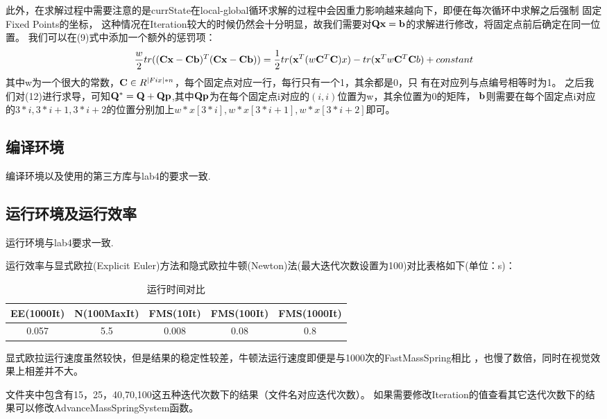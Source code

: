 \documentclass[]{ctexart}
\begin{document}
此外，在求解过程中需要注意的是currState在local-global循环求解的过程中会因重力影响越来越向下，即便在每次循环中求解之后强制
固定Fixed Points的坐标，
这种情况在Iteration较大的时候仍然会十分明显，故我们需要对$\bold{Q}\bold{x}=\bold{b}$的求解进行修改，将固定点前后确定在同一位置。
我们可以在(9)式中添加一个额外的惩罚项：
\begin{equation}
	\frac{w}{2}tr((\bold{C}\bold{x}-\bold{C}\bold{b})^T(\bold{C}\bold{x}-\bold{C}\bold{b}))=
	\frac{1}{2}tr(\bold{x}^T(w\bold{C}^T\bold{C})x)-tr(\bold{x}^Tw\bold{C}^T\bold{C}b)+constant
\end{equation}
其中w为一个很大的常数，$\bold{C}\in R^{\left\lvert Fix\right\rvert *n}$，每个固定点对应一行，每行只有一个1，其余都是0，只
有在对应列与点编号相等时为1。
之后我们对(12)进行求导，可知$\bold{Q^*}=\bold{Q}+\bold{Qp}$,其中$\bold{Qp}$为在每个固定点i对应的$(i,i)$位置为w，其余位置为0的矩阵，
$\bold{b}$则需要在每个固定点i对应的$3*i,3*i+1,3*i+2$的位置分别加上$w*x[3*i],w*x[3*i+1],w*x[3*i+2]$即可。
\subsection{编译环境}

编译环境以及使用的第三方库与lab4的要求一致.

\subsection{运行环境及运行效率}

运行环境与lab4要求一致.

运行效率与显式欧拉(Explicit Euler)方法和隐式欧拉牛顿(Newton)法(最大迭代次数设置为100)对比表格如下(单位：s)：
\begin{table}[h!]
	\begin{center}
	  \caption{运行时间对比}
	  \begin{tabular}{c|c|c|c|c} 
		\textbf{EE(1000It)} & \textbf{N(100MaxIt)} & \textbf{FMS(10It)}&\textbf{FMS(100It)}&\textbf{FMS(1000It)}\\
		\hline
		0.057 & 5.5 & 0.008&0.08&0.8\\
	  \end{tabular}
	\end{center}
  \end{table}
显式欧拉运行速度虽然较快，但是结果的稳定性较差，牛顿法运行速度即便是与1000次的FastMassSpring相比
，也慢了数倍，同时在视觉效果上相差并不大。

文件夹中包含有15，25，40,70,100这五种迭代次数下的结果（文件名对应迭代次数）。
如果需要修改Iteration的值查看其它迭代次数下的结果可以修改AdvanceMassSpringSystem函数。
\end{document}
